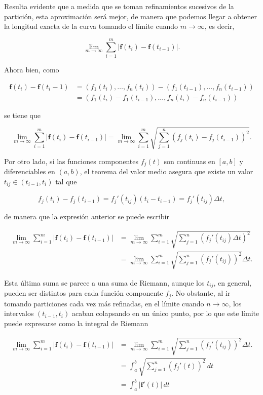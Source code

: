 \documentclass[
  a4paper,
]{scrreport}
\theoremstyle{definition}
\theoremstyle{plain}
\theoremstyle{definition}
\theoremstyle{definition}
\theoremstyle{plain}
\theoremstyle{plain}
\theoremstyle{remark}
\begin{document}
Resulta evidente que a medida que se toman refinamientos sucesivos de la
partición, esta aproximación será mejor, de manera que podemos llegar a
obtener la longitud exacta de la curva tomando el límite cuando
\(m\to\infty\), es decir,

\[
\lim_{m\to\infty}\sum_{i=1}^m |\mathbf{f}(t_i)-\mathbf{f}(t_{i-1})|.
\]

Ahora bien, como

\begin{align*}
\mathbf{f}(t_i)-\mathbf{f}(t_i-1) 
&= (f_1(t_i),\ldots,f_n(t_i))-(f_1(t_{i-1}),\ldots,f_n(t_{i-1})) \\
&= (f_1(t_i)-f_1(t_{i-1}),\ldots,f_n(t_i)-f_n(t_{i-1}))
\end{align*}

se tiene que

\[
\lim_{m\to\infty}\sum_{i=1}^m |\mathbf{f}(t_i)-\mathbf{f}(t_{i-1})| =
\lim_{m\to\infty}\sum_{i=1}^m \sqrt{\sum_{j=1}^n (f_j(t_i)-f_j(t_{i-1}))^2}.
\]

Por otro lado, si las funciones componentes \(f_j(t)\) son continuas en
\([a,b]\) y diferenciables en \((a,b)\), el teorema del valor medio
asegura que existe un valor \(t_{ij}\in(t_{i-1},t_i)\) tal que

\[
f_j(t_i)-f_j(t_{i-1}) = f_j'(t_{ij})(t_i-t_{i-1}) = f_j'(t_{ij}) \Delta t,
\]

de manera que la expresión anterior se puede escribir

\begin{align*}
\lim_{m\to\infty}\sum_{i=1}^m |\mathbf{f}(t_i)-\mathbf{f}(t_{i-1})| 
&= \lim_{m\to\infty}\sum_{i=1}^m \sqrt{\sum_{j=1}^n (f_j'(t_{ij})\Delta t)^2} \\
&= \lim_{m\to\infty}\sum_{i=1}^m \sqrt{\sum_{j=1}^n (f_j'(t_{ij}))^2}\Delta t.
\end{align*}

Esta última suma se parece a una suma de Riemann, aunque los \(t_{ij}\),
en general, pueden ser distintos para cada función componente \(f_j\).
No obstante, al ir tomando particiones cada vez más refinadas, en el
límite cuando \(n\to\infty\), los intervalos \((t_{i-1},t_i)\) acaban
colapsando en un único punto, por lo que este límite puede expresarse
como la integral de Riemann

\begin{align*}
\lim_{m\to\infty}\sum_{i=1}^m |\mathbf{f}(t_i)-\mathbf{f}(t_{i-1})| 
&= \lim_{m\to\infty}\sum_{i=1}^m \sqrt{\sum_{j=1}^n (f_j'(t_{ij}))^2}\Delta t. \\
&= \int_a^b \sqrt{\sum_{j=1}^n (f_j'(t))^2}\, dt \\
&= \int_a^b |\mathbf{f}'(t)|\, dt
\end{align*}
\end{document}
